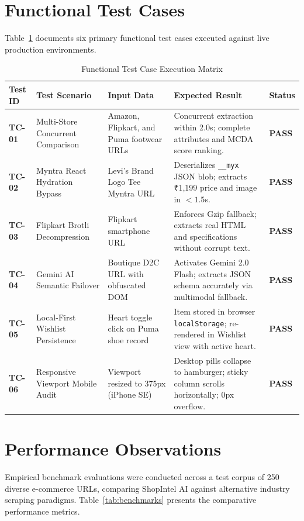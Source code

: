 \documentclass[12pt,a4paper,oneside]{report}
\begin{document}
\section{Functional Test Cases}
Table~\ref{tab:test_cases} documents six primary functional test cases executed against live production environments.

\begin{table}[h!]
\centering
\small
\caption{Functional Test Case Execution Matrix}
\label{tab:test_cases}
\begin{tabularx}{\textwidth}{p{1.2cm} p{3.2cm} p{3.0cm} p{3.5cm} p{1.2cm}}
\toprule
\textbf{Test ID} & \textbf{Test Scenario} & \textbf{Input Data} & \textbf{Expected Result} & \textbf{Status} \\
\midrule
\textbf{TC-01} & Multi-Store Concurrent Comparison & Amazon, Flipkart, and Puma footwear URLs & Concurrent extraction within 2.0s; complete attributes and MCDA score ranking. & \textbf{\color{emerald}PASS} \\
\textbf{TC-02} & Myntra React Hydration Bypass & Levi's Brand Logo Tee Myntra URL & Deserializes \texttt{\_\_myx} JSON blob; extracts ₹1,199 price and image in $<1.5$s. & \textbf{\color{emerald}PASS} \\
\textbf{TC-03} & Flipkart Brotli Decompression & Flipkart smartphone URL & Enforces Gzip fallback; extracts real HTML and specifications without corrupt text. & \textbf{\color{emerald}PASS} \\
\textbf{TC-04} & Gemini AI Semantic Failover & Boutique D2C URL with obfuscated DOM & Activates Gemini 2.0 Flash; extracts JSON schema accurately via multimodal fallback. & \textbf{\color{emerald}PASS} \\
\textbf{TC-05} & Local-First Wishlist Persistence & Heart toggle click on Puma shoe record & Item stored in browser \texttt{localStorage}; re-rendered in Wishlist view with active heart. & \textbf{\color{emerald}PASS} \\
\textbf{TC-06} & Responsive Viewport Mobile Audit & Viewport resized to 375px (iPhone SE) & Desktop pills collapse to hamburger; sticky column scrolls horizontally; 0px overflow. & \textbf{\color{emerald}PASS} \\
\bottomrule
\end{tabularx}
\end{table}

\section{Performance Observations}
Empirical benchmark evaluations were conducted across a test corpus of 250 diverse e-commerce URLs, comparing ShopIntel AI against alternative industry scraping paradigms. Table~\ref{tab:benchmarks} presents the comparative performance metrics.
\end{document}
